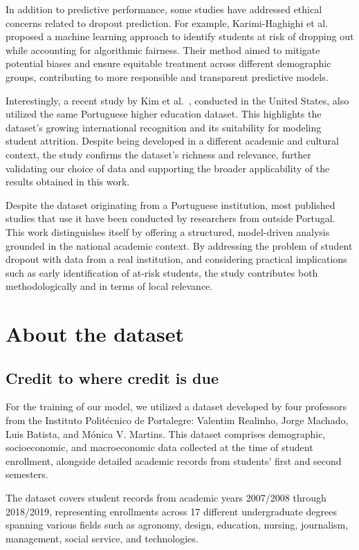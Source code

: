 \documentclass[runningheads]{llncs}
\begin{document}
In addition to predictive performance, some studies have addressed ethical concerns related to dropout prediction. For example, Karimi-Haghighi et al.~\cite{karimihaghighi2021predictingearlydropoutcalibration} proposed a machine learning approach to identify students at risk of dropping out while accounting for algorithmic fairness. Their method aimed to mitigate potential biases and ensure equitable treatment across different demographic groups, contributing to more responsible and transparent predictive models.

Interestingly, a recent study by Kim et al.~\cite{kim2023studentsdropoutuniversity}, conducted in the United States, also utilized the same Portuguese higher education dataset. This highlights the dataset’s growing international recognition and its suitability for modeling student attrition. Despite being developed in a different academic and cultural context, the study confirms the dataset's richness and relevance, further validating our choice of data and supporting the broader applicability of the results obtained in this work.

Despite the dataset originating from a Portuguese institution, most published studies that use it have been conducted by researchers from outside Portugal. This work distinguishes itself by offering a structured, model-driven analysis grounded in the national academic context. By addressing the problem of student dropout with data from a real institution, and considering practical implications such as early identification of at-risk students, the study contributes both methodologically and in terms of local relevance.



\section{About the dataset}
\subsection{Credit to where credit is due}
For the training of our model, we utilized a dataset developed by four professors from the Instituto Politécnico de Portalegre: Valentim Realinho, Jorge Machado, Luis Batista, and Mónica V. Martins. This dataset comprises demographic, socioeconomic, and macroeconomic data collected at the time of student enrollment, alongside detailed academic records from students' first and second semesters.

The dataset covers student records from academic years 2007/2008 through 2018/2019, representing enrollments across 17 different undergraduate degrees spanning various fields such as agronomy, design, education, nursing, journalism, management, social service, and technologies.
\end{document}
